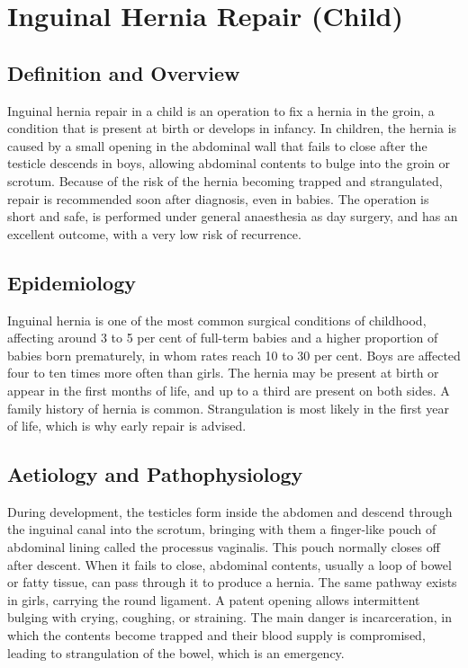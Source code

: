 \chapter{Inguinal Hernia Repair (Child)}

\section*{Definition and Overview}
Inguinal hernia repair in a child is an operation to fix a hernia in the groin, a condition that is present at birth or develops in infancy. In children, the hernia is caused by a small opening in the abdominal wall that fails to close after the testicle descends in boys, allowing abdominal contents to bulge into the groin or scrotum. Because of the risk of the hernia becoming trapped and strangulated, repair is recommended soon after diagnosis, even in babies. The operation is short and safe, is performed under general anaesthesia as day surgery, and has an excellent outcome, with a very low risk of recurrence.

\section*{Epidemiology}
Inguinal hernia is one of the most common surgical conditions of childhood, affecting around 3 to 5 per cent of full-term babies and a higher proportion of babies born prematurely, in whom rates reach 10 to 30 per cent. Boys are affected four to ten times more often than girls. The hernia may be present at birth or appear in the first months of life, and up to a third are present on both sides. A family history of hernia is common. Strangulation is most likely in the first year of life, which is why early repair is advised.

\section*{Aetiology and Pathophysiology}
During development, the testicles form inside the abdomen and descend through the inguinal canal into the scrotum, bringing with them a finger-like pouch of abdominal lining called the processus vaginalis. This pouch normally closes off after descent. When it fails to close, abdominal contents, usually a loop of bowel or fatty tissue, can pass through it to produce a hernia. The same pathway exists in girls, carrying the round ligament. A patent opening allows intermittent bulging with crying, coughing, or straining. The main danger is incarceration, in which the contents become trapped and their blood supply is compromised, leading to strangulation of the bowel, which is an emergency.

